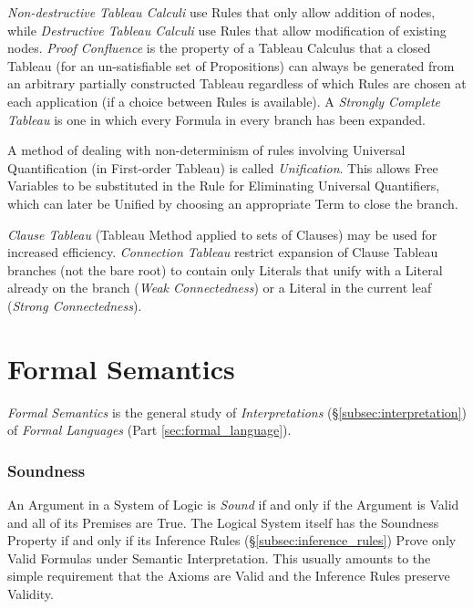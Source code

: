 \documentclass{article}
\begin{document}
\emph{Non-destructive Tableau Calculi} use Rules that only allow
addition of nodes, while \emph{Destructive Tableau Calculi} use Rules
that allow modification of existing nodes. \emph{Proof Confluence} is
the property of a Tableau Calculus that a closed Tableau (for an
un-satisfiable set of Propositions) can always be generated from an
arbitrary partially constructed Tableau regardless of which Rules are
chosen at each application (if a choice between Rules is available). A
\emph{Strongly Complete Tableau} is one in which every Formula in
every branch has been expanded.

A method of dealing with non-determinism of rules involving Universal
Quantification (in First-order Tableau) is called
\emph{Unification}. This allows Free Variables to be substituted in
the Rule for Eliminating Universal Quantifiers, which can later be
Unified by choosing an appropriate Term to close the branch.

\emph{Clause Tableau} (Tableau Method applied to sets of Clauses) may
be used for increased efficiency. \emph{Connection Tableau} restrict
expansion of Clause Tableau branches (not the bare root) to contain
only Literals that unify with a Literal already on the branch
(\emph{Weak Connectedness}) or a Literal in the current leaf
(\emph{Strong Connectedness}).

\part{Formal Semantics}

\emph{Formal Semantics} is the general study of \emph{Interpretations}
(\S\ref{subsec:interpretation}) of \emph{Formal Languages} (Part
\ref{sec:formal_language}).

\section{Soundness}\label{sec:soundness}

An Argument in a System of Logic is \emph{Sound} if and only if the
Argument is Valid and all of its Premises are True. The Logical System
itself has the Soundness Property if and only if its Inference Rules
(\S\ref{subsec:inference_rules}) Prove only Valid Formulas under
Semantic Interpretation. This usually amounts to the simple
requirement that the Axioms are Valid and the Inference Rules preserve
Validity.
\end{document}
